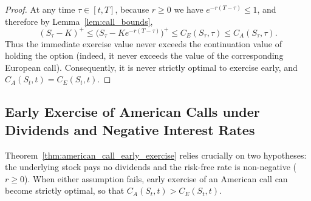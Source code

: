 \begin{proof}
At any time $\tau \in [t, T]$, because $r \ge 0$ we have $e^{-r(T-\tau)} \le 1$, and therefore by Lemma~\ref{lem:call_bounds},
\[
    (S_\tau - K)^+ \le \bigl(S_\tau - K e^{-r(T-\tau)}\bigr)^+ \le C_E(S_\tau, \tau) \le C_A(S_\tau, \tau).
\]
Thus the immediate exercise value never exceeds the continuation value of holding the option (indeed, it never exceeds the value of the corresponding European call). Consequently, it is never strictly optimal to exercise early, and $C_A(S_t, t) = C_E(S_t, t)$.
\end{proof}

\subsection{Early Exercise of American Calls under Dividends and Negative Interest Rates}

Theorem~\ref{thm:american_call_early_exercise} relies crucially on two hypotheses: the underlying stock pays no dividends and the risk-free rate is non-negative ($r \ge 0$). When either assumption fails, early exercise of an American call can become strictly optimal, so that $C_A(S_t, t) > C_E(S_t, t)$.

